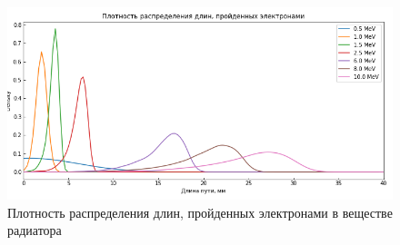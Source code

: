 \documentclass[12pt,a4paper]{report} %
\begin{document}
\begin{figure}[th!]
\begin{center}
\includegraphics[width=.9\textwidth]{pictures/GEANT/length_density.png}
\caption{Плотность распределения длин, пройденных электронами в веществе радиатора}
\label{fig:lenght_density}
\end{center}
\end{figure}
\end{document}
